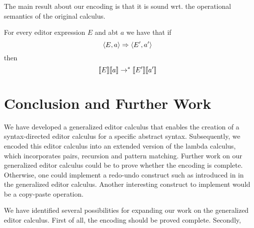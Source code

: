 \documentclass[sigplan,anonymous,review]{acmart}
\begin{document}
The main result about our encoding is that it is sound wrt. the
operational semantics of the original calculus.

\begin{theorem}[Soundness] For every editor expression $E$ and abt $a$
  we have that if
  \[ \langle E,a \rangle \stackrel{}{\Rightarrow} \langle E',a' \rangle \]
  then
  \[ \llbracket E \rrbracket\llbracket a \rrbracket \rightarrow^{\ast}  \llbracket E' \rrbracket\llbracket a' \rrbracket  \]
\end{theorem}

\section{Conclusion and Further Work}

We have developed a generalized editor calculus that enables the
creation of a syntax-directed editor calculus for a specific abstract
syntax. Subsequently, we encoded this editor calculus into an extended
version of the lambda calculus, which incorporates pairs, recursion
and pattern matching.  Further work on our generalized editor calculus
could be to prove whether the encoding is complete. Otherwise, one
could implement a redo-undo construct such as introduced in
\cite{undo_Edit} in the generalized editor calculus. Another
interesting construct to implement would be a copy-paste operation.


We have identified several possibilities for expanding our work on the
generalized editor calculus. First of all, the encoding should be
proved complete. Secondly, 




\end{document}
